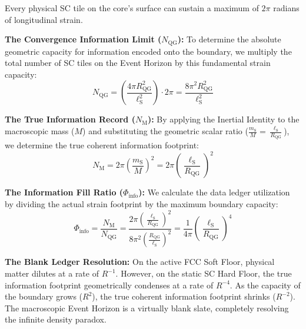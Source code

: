 Every physical SC tile on the core's surface can sustain a maximum of $2\pi$ radians of longitudinal strain.

\vspace{0.5em}
\noindent\textbf{The Convergence Information Limit ($N_{\mathrm{QG}}$):} To determine the absolute geometric capacity for information encoded onto the boundary, we multiply the total number of SC tiles on the Event Horizon by this fundamental strain capacity:
\begin{equation}
    N_{\mathrm{QG}} = \left( \frac{4\pi R_{\mathrm{QG}}^2}{\ell_{\mathrm{S}}^2} \right) \cdot 2\pi = \frac{8\pi^2 R_{\mathrm{QG}}^2}{\ell_{\mathrm{S}}^2}
\end{equation}

\vspace{0.5em}
\noindent\textbf{The True Information Record ($N_{\mathrm{M}}$):} By applying the Inertial Identity to the macroscopic mass ($M$) and substituting the geometric scalar ratio ($\frac{m_{\mathrm{S}}}{M} = \frac{\ell_{\mathrm{S}}}{R_{\mathrm{QG}}}$), we determine the true coherent information footprint:
\begin{equation}
    N_{\mathrm{M}} = 2\pi \left(\frac{m_{\mathrm{S}}}{M}\right)^2 = 2\pi \left(\frac{\ell_{\mathrm{S}}}{R_{\mathrm{QG}}}\right)^2
\end{equation}

\vspace{0.5em}
\noindent\textbf{The Information Fill Ratio ($\Phi_{\mathrm{info}}$):} We calculate the data ledger utilization by dividing the actual strain footprint by the maximum boundary capacity:
\begin{equation}
    \Phi_{\mathrm{info}} = \frac{N_{\mathrm{M}}}{N_{\mathrm{QG}}} = \frac{2\pi \left( \frac{\ell_{\mathrm{S}}}{R_{\mathrm{QG}}} \right)^2}{8\pi^2 \left( \frac{R_{\mathrm{QG}}}{\ell_{\mathrm{S}}} \right)^2} = \frac{1}{4\pi} \left( \frac{\ell_{\mathrm{S}}}{R_{\mathrm{QG}}} \right)^4
\end{equation}

\vspace{0.5em}
\noindent\textbf{The Blank Ledger Resolution:} On the active FCC Soft Floor, physical matter dilutes at a rate of $R^{-1}$. However, on the static SC Hard Floor, the true information footprint geometrically condenses at a rate of $R^{-4}$. As the capacity of the boundary grows ($R^2$), the true coherent information footprint shrinks ($R^{-2}$). The macroscopic Event Horizon is a virtually blank slate, completely resolving the infinite density paradox.

